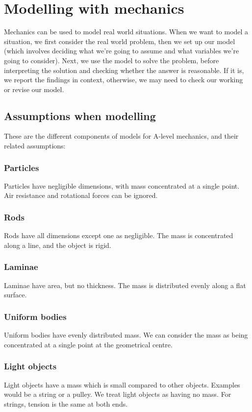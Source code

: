 \section{Modelling with mechanics}
Mechanics can be used to model real world situations. When we want to model a situation, we first consider the real world problem, then we set up our model (which involves deciding what we're going to assume and what variables we're going to consider). Next, we use the model to solve the problem, before interpreting the solution and checking whether the answer is reasonable. If it is, we report the findings in context, otherwise, we may need to check our working or revise our model.

\subsection{Assumptions when modelling}
These are the different components of models for A-level mechanics, and their related assumptions:
\subsubsection{Particles}
Particles have negligible dimensions, with mass concentrated at a single point. Air resistance and rotational forces can be ignored.
\subsubsection{Rods}
Rods have all dimensions except one as negligible. The mass is concentrated along a line, and the object is rigid.
\subsubsection{Laminae}
Laminae have area, but no thickness. The mass is distributed evenly along a flat surface.
\subsubsection{Uniform bodies}
Uniform bodies have evenly distributed mass. We can consider the mass as being concentrated at a single point at the geometrical centre.
\subsubsection{Light objects}
Light objects have a mass which is small compared to other objects. Examples would be a string or a pulley. We treat light objects as having no mass. For strings, tension is the same at both ends.
